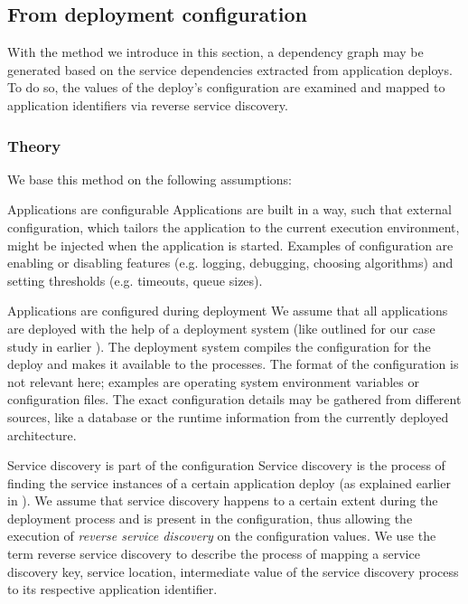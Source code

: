 
\subsection{From deployment configuration}
\label{subsec:graphfromdeploymentconf}

With the method we introduce in this section, a dependency graph may be generated based on the service dependencies extracted from application deploys. To do so, the values of the deploy's configuration are examined and mapped to application identifiers via reverse service discovery.

\subsubsection{Theory}

We base this method on the following assumptions:

\begin{tdescription}
  \item[Applications are configurable] Applications are built in a way, such that external configuration, which tailors the application to the current execution environment, might be injected when the application is started. Examples of configuration are enabling or disabling features (e.g. logging, debugging, choosing algorithms) and setting thresholds (e.g. timeouts, queue sizes).
  \item[Applications are configured during deployment] We assume that all applications are deployed with the help of a deployment system (like outlined for our case study in earlier ). The deployment system compiles the configuration for the deploy and makes it available to the processes. The format of the configuration is not relevant here; examples are operating system environment variables or configuration files. The exact configuration details may be gathered from different sources, like a database or the runtime information from the currently deployed architecture.
  \item[Service discovery is part of the configuration] Service discovery is the process of finding the service instances of a certain application deploy (as explained earlier in ). We assume that service discovery happens to a certain extent during the deployment process and is present in the configuration, thus allowing the execution of \emph{reverse service discovery} on the configuration values. We use the term reverse service discovery to describe the process of mapping a service discovery key, service location, intermediate value of the service discovery process to its respective application identifier.
\end{tdescription}

